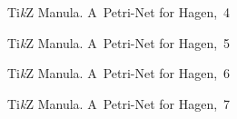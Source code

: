 \documentclass[a4paper,11pt]{article}
\begin{document}
\begin{figure}[ht]

  \centering

  \begin{tikzpicture}



  \end{tikzpicture}

  \caption{Ti\emph{k}Z Manula. A~Petri-Net for Hagen,~4}

\end{figure}





\begin{figure}[ht]

  \centering

  \begin{tikzpicture}



  \end{tikzpicture}

  \caption{Ti\emph{k}Z Manula. A~Petri-Net for Hagen,~5}

\end{figure}





\begin{figure}[ht]

  \centering

  \begin{tikzpicture}



  \end{tikzpicture}

  \caption{Ti\emph{k}Z Manula. A~Petri-Net for Hagen,~6}

\end{figure}





\begin{figure}[ht]

  \centering

  \begin{tikzpicture}



  \end{tikzpicture}

  \caption{Ti\emph{k}Z Manula. A~Petri-Net for Hagen,~7}

\end{figure}
\end{document}
